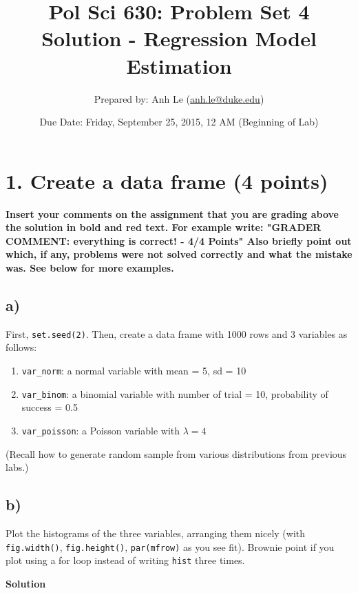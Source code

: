 \documentclass{article}\usepackage[]{graphicx}\usepackage[]{color}
\begin{document}
\title{Pol Sci 630: Problem Set 4 Solution - Regression Model Estimation}

\author{Prepared by: Anh Le (\href{mailto:anh.le@duke.edu}{anh.le@duke.edu})}

\date{Due Date: Friday, September 25, 2015, 12 AM (Beginning of Lab)}

\maketitle

\section*{1. Create a data frame (4 points)}

\textbf{\color{red} Insert your comments on the assignment that you are grading above the solution in bold and red text. For example write: "GRADER COMMENT: everything is correct! - 4/4 Points" Also briefly point out which, if any, problems were not solved correctly and what the mistake was. See below for more examples.}

\subsection*{a)}
First, \verb`set.seed(2)`. Then, create a data frame with 1000 rows and 3 variables as follows:
\begin{enumerate}
\item \verb`var_norm`: a normal variable with mean = 5, sd = 10
\item \verb`var_binom`: a binomial variable with number of trial = 10, probability of success = 0.5
\item \verb`var_poisson`: a Poisson variable with $\lambda = 4$
\end{enumerate}

(Recall how to generate random sample from various distributions from previous labs.)

\subsection*{b)}

Plot the histograms of the three variables, arranging them nicely (with \verb`fig.width()`, \verb`fig.height()`, \verb`par(mfrow)` as you see fit). Brownie point if you plot using a for loop instead of writing \verb`hist` three times.

\textbf{Solution}
\end{document}
